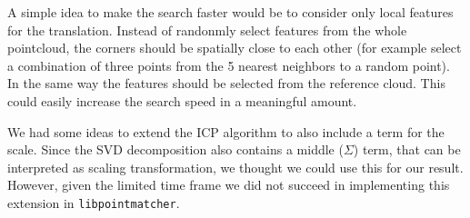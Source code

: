 \documentclass[10pt,twocolumn,letterpaper]{article}
\begin{document}
A simple idea to make the search faster would be to consider only local features for the translation. Instead of randonmly select features from the whole pointcloud, the corners should be spatially close to each other (for example select a combination of three points from the 5 nearest neighbors to a random point). In the same way the features should be selected from the reference cloud. This could easily increase the search speed in a meaningful amount.

We had some ideas to extend the ICP algorithm to also include a term for the scale. Since the SVD decomposition also contains a middle ($\Sigma$) term, that can be interpreted as scaling transformation, we thought we could use this for our result.
However, given the limited time frame we did not succeed in implementing this extension in \texttt{libpointmatcher}.


{\small


}
\end{document}
